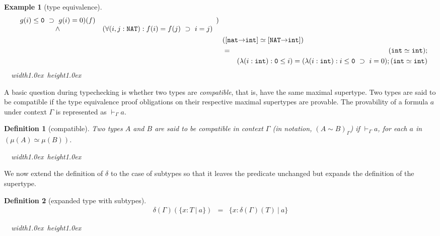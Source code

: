 \documentclass [12pt,twoside]{cslreport}
\newcommand{\thmbox}
   {{\ \hfill\hbox{%
      \vrule width1.0ex height1.0ex
   }\parfillskip 0pt }}
\newtheorem{example}[thm]{Example}
\newcommand{\aro}{\mathord\rightarrow} %
\newcommand{\funtype}[2]{[#1 \aro #2]}
\newcommand{\ttint}{\mathtt{int}}
\newcommand{\ttnat}{\mathtt{nat}}
\newcommand{\vbar}{\ |\ }
\newenvironment{Eg}[1]{\begin{example}[#1]\label{eg:#1}\em }{\thmbox\end{example}}
\newtheorem{definition}{Definition}
\newenvironment{Defn}[1]{\begin{definition}[#1]\label{defn:#1}}{
\thmbox\end{definition}}
\begin{document}
\begin{Eg}{type equivalence}
\begin{eqnarray*}
\begin{array}[t]{cl}
\begin{array}[t]{cl}
g(i) \leq \mathtt{0}\ \supset\ g(i) = 0)(f) \\
\wedge & (\forall (i, j: \mathtt{NAT}): f(i) = f(j) \ \supset\  i = j)
      \end{array} )
 \end{array}\\
\lefteqn{(\funtype{\ttnat}{\ttint} \simeq \funtype{ \mathtt{NAT}}{
\mathtt{int}})}\\
& = & (\ttint \simeq \ttint);\\&& (\lambda (i : \ttint): \mathtt{0} \leq i) =
                              (\lambda (i : \ttint): 
i\leq \mathtt{0}\  \supset\ i = 0); (\ttint\simeq\ttint)
\end{eqnarray*}
\end{Eg}

A basic question during typechecking is whether two types are
\emph{compatible}, that is,  have the same maximal supertype.  
Two types are said to be compatible if the type equivalence proof
obligations on their respective 
maximal supertypes are provable.  The provability of a formula $a$
under context $\Gamma$ is represented as $\vdash_\Gamma a$\@.  
\begin{Defn}{compatible}
\emph{Two types $A$ and $B$ are said to be compatible in context $\Gamma$
(in notation, $(A \sim B)_\Gamma$)
if $\vdash_\Gamma a$, for each $a$ in $(\mu(A)\simeq \mu(B))$.}\footnotemark
\end{Defn}


\begin{comment}
With subtypes, it is easy to define an empty subtype and then
declare a constant of such an empty subtype.  The context thus has to be
checked to disallow such an inconsistency.
\end{comment}
We now extend the
definition of $\delta$ to the case of subtypes so that it leaves the
predicate unchanged but expands the definition of the supertype.
%
\begin{Defn}{expanded type with subtypes}
\begin{eqnarray*}
  \delta(\Gamma)(\{x : T \vbar a\}) & = & \{x : \delta(\Gamma)(T) \vbar a \}
\end{eqnarray*}
\end{Defn}
\end{document}
